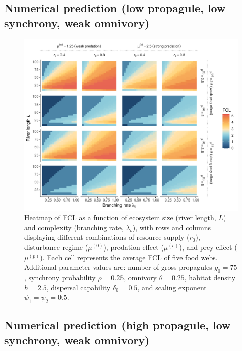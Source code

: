 \subsection*{Numerical prediction (low propagule, low synchrony, weak
omnivory)}\label{numerical-prediction-low-propagule-low-synchrony-weak-omnivory}

\begin{figure}
\centering
\includegraphics{../data_fmt/fig_rho025_g75_theta025.pdf}
\caption{Heatmap of FCL as a function of ecosystem size (river length,
\(L\)) and complexity (branching rate, \(\lambda_b\)), with rows and
columns displaying different combinations of resource supply (\(r_0\)),
disturbance regime (\(\mu^{(0)}\)), predation effect (\(\mu^{(c)}\)),
and prey effect (\(\mu^{(p)}\)). Each cell represents the average FCL of
five food webs. Additional parameter values are: number of gross
propagules \(g_0=75\), synchrony probability \(\rho=0.25\), omnivory
\(\theta=0.25\), habitat density \(h=2.5\), dispersal capability
\(\delta_0=0.5\), and scaling exponent \(\psi_1=\psi_2=0.5\).}
\end{figure}

\newpage

\subsection*{Numerical prediction (high propagule, low synchrony, weak
omnivory)}\label{numerical-prediction-high-propagule-low-synchrony-weak-omnivory}

